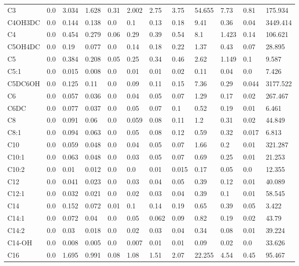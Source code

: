 \begin{tabular}{llllllllllll}
C3 & 0.0 & 3.034 & 1.628 & 0.31 & 2.002 & 2.75 & 3.75 & 54.655 & 7.73 & 0.81 & 175.934 \\
C4OH\C3DC & 0.0 & 0.144 & 0.138 & 0.0 & 0.1 & 0.13 & 0.18 & 9.41 & 0.36 & 0.04 & 3449.414 \\
C4 & 0.0 & 0.454 & 0.279 & 0.06 & 0.29 & 0.39 & 0.54 & 8.1 & 1.423 & 0.14 & 106.621 \\
C5OH\C4DC & 0.0 & 0.19 & 0.077 & 0.0 & 0.14 & 0.18 & 0.22 & 1.37 & 0.43 & 0.07 & 28.895 \\
C5 & 0.0 & 0.384 & 0.208 & 0.05 & 0.25 & 0.34 & 0.46 & 2.62 & 1.149 & 0.1 & 9.587 \\
C5:1 & 0.0 & 0.015 & 0.008 & 0.0 & 0.01 & 0.01 & 0.02 & 0.11 & 0.04 & 0.0 & 7.426 \\
C5DC\C6OH & 0.0 & 0.125 & 0.11 & 0.0 & 0.09 & 0.11 & 0.15 & 7.36 & 0.29 & 0.044 & 3177.522 \\
C6 & 0.0 & 0.057 & 0.036 & 0.0 & 0.04 & 0.05 & 0.07 & 1.29 & 0.17 & 0.02 & 267.467 \\
C6DC & 0.0 & 0.077 & 0.037 & 0.0 & 0.05 & 0.07 & 0.1 & 0.52 & 0.19 & 0.01 & 6.461 \\
C8 & 0.0 & 0.091 & 0.06 & 0.0 & 0.059 & 0.08 & 0.11 & 1.2 & 0.31 & 0.02 & 44.849 \\
C8:1 & 0.0 & 0.094 & 0.063 & 0.0 & 0.05 & 0.08 & 0.12 & 0.59 & 0.32 & 0.017 & 6.813 \\
C10 & 0.0 & 0.059 & 0.048 & 0.0 & 0.04 & 0.05 & 0.07 & 1.66 & 0.2 & 0.01 & 321.287 \\
C10:1 & 0.0 & 0.063 & 0.048 & 0.0 & 0.03 & 0.05 & 0.07 & 0.69 & 0.25 & 0.01 & 21.253 \\
C10:2 & 0.0 & 0.01 & 0.012 & 0.0 & 0.0 & 0.01 & 0.015 & 0.17 & 0.05 & 0.0 & 12.355 \\
C12 & 0.0 & 0.041 & 0.023 & 0.0 & 0.03 & 0.04 & 0.05 & 0.39 & 0.12 & 0.01 & 40.089 \\
C12:1 & 0.0 & 0.032 & 0.021 & 0.0 & 0.02 & 0.03 & 0.04 & 0.39 & 0.1 & 0.01 & 58.545 \\
C14 & 0.0 & 0.152 & 0.072 & 0.01 & 0.1 & 0.14 & 0.19 & 0.65 & 0.39 & 0.05 & 3.422 \\
C14:1 & 0.0 & 0.072 & 0.04 & 0.0 & 0.05 & 0.062 & 0.09 & 0.82 & 0.19 & 0.02 & 43.79 \\
C14:2 & 0.0 & 0.03 & 0.018 & 0.0 & 0.02 & 0.03 & 0.04 & 0.34 & 0.08 & 0.01 & 39.224 \\
C14-OH & 0.0 & 0.008 & 0.005 & 0.0 & 0.007 & 0.01 & 0.01 & 0.09 & 0.02 & 0.0 & 33.626 \\
C16 & 0.0 & 1.695 & 0.991 & 0.08 & 1.08 & 1.51 & 2.07 & 22.255 & 4.54 & 0.45 & 95.467 \\

\end{tabular}
